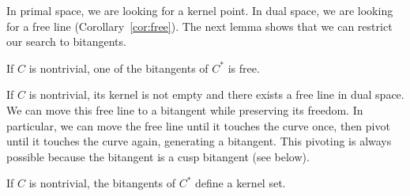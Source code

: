 \documentclass[12pt]{article}
\newif\ifTalk
\begin{document}
\ifTalk
\begin{lemma}
The tangent of an inflection point of $C$ dualizes to a cusp of $C^*$.
\end{lemma}
\fi



In primal space, we are looking for a kernel point.
In dual space, we are looking for a free line (Corollary~\ref{cor:free}).
The next lemma shows that we can restrict our search to bitangents.

\begin{lemma}
\label{lem:existence}
If $C$ is nontrivial,
one of the bitangents of $C^*$ is free.
\end{lemma}
\prf
If $C$ is nontrivial, its kernel is not empty and 
there exists a free line in dual space.
We can move this free line to a bitangent while preserving its freedom.
In particular, we can move the free line until it touches the curve once,
then pivot until it touches the curve again, generating a bitangent.
This pivoting is always possible because the bitangent is a cusp
bitangent (see below).
%
%
\QED

\vspace{-.3in}

\begin{corollary}
If $C$ is nontrivial, the bitangents of $C^*$ define a kernel set.
\end{corollary}
\end{document}
